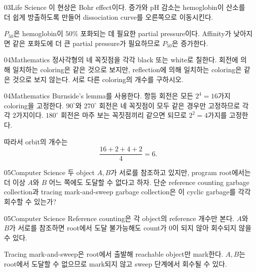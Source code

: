 \documentclass[12pt,aspectratio=169]{beamer}
\begin{document}
\begin{solutionframe}{03}{Life Science}
이 현상은 Bohr effect이다.  증가와 pH 감소는 hemoglobin이 산소를 더 쉽게 방출하도록 만들어 dissociation curve를 오른쪽으로 이동시킨다.

$P_{50}$은 hemoglobin이 $50\%$ 포화되는 데 필요한  partial pressure이다. Affinity가 낮아지면 같은 포화도에 더 큰  partial pressure가 필요하므로 $P_{50}$은 증가한다.
\end{solutionframe}

\begin{problemframe}{04}{Mathematics}
정사각형의 네 꼭짓점을 각각 black 또는 white로 칠한다. 회전에 의해 일치하는 coloring은 같은 것으로 보지만, reflection에 의해 일치하는 coloring은 같은 것으로 보지 않는다. 서로 다른 coloring의 개수를 구하시오.
\end{problemframe}

\begin{solutionframe}{04}{Mathematics}
Burnside's lemma를 사용한다. 항등 회전은 모든 $2^4=16$가지 coloring을 고정한다. $90^\circ$와 $270^\circ$ 회전은 네 꼭짓점이 모두 같은 경우만 고정하므로 각각 $2$가지이다. $180^\circ$ 회전은 마주 보는 꼭짓점끼리 같으면 되므로 $2^2=4$가지를 고정한다.

따라서 orbit의 개수는
\[
\frac{16+2+4+2}{4}=6.
\]
\end{solutionframe}

\begin{problemframe}{05}{Computer Science}
두 object $A,B$가 서로를 참조하고 있지만, program root에서는 더 이상 $A$와 $B$ 어느 쪽에도 도달할 수 없다고 하자. 단순 reference counting garbage collection과 tracing mark-and-sweep garbage collection은 이 cyclic garbage를 각각 회수할 수 있는가?
\end{problemframe}

\begin{solutionframe}{05}{Computer Science}
Reference counting은 각 object의 reference 개수만 본다. $A$와 $B$가 서로를 참조하면 root에서 도달 불가능해도 count가 $0$이 되지 않아 회수되지 않을 수 있다.

Tracing mark-and-sweep은 root에서 출발해 reachable object만 mark한다. $A,B$는 root에서 도달할 수 없으므로 mark되지 않고 sweep 단계에서 회수될 수 있다.
\end{solutionframe}
\end{document}
